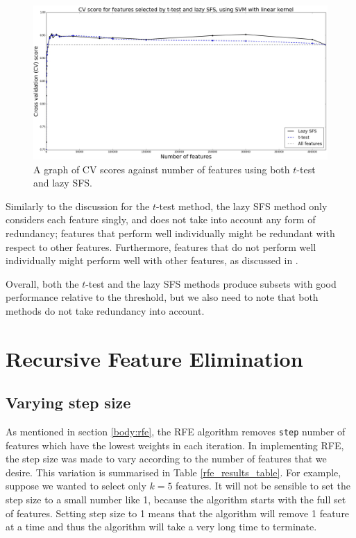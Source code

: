 \documentclass[12pt, twoside, a4paper]{report}
\begin{document}
\begin{figure}
\centering
\includegraphics[width=\textwidth]{images/t_test_and_lazy_sfs.jpeg}
\caption{A graph of CV scores against number of features using both $t$-test and lazy SFS.}
\label{body:t_test_and_lazy_sfs:graph}
\end{figure}

Similarly to the discussion for the $t$-test method, the lazy SFS method only considers each feature singly, and does not take into account any form of redundancy; features that perform well individually might be redundant with respect to other features. Furthermore, features that do not perform well individually might perform well with other features, as discussed in \cite{RefWorks:140}.


Overall, both the $t$-test and the lazy SFS methods produce subsets with good performance relative to the threshold, but we also need to note that both methods do not take redundancy into account.


\section{Recursive Feature Elimination} \label{eval:rfe}

\subsection{Varying step size}
As mentioned in section \ref{body:rfe}, the RFE algorithm removes \texttt{step} number of features which have the lowest weights in each iteration. In implementing RFE, the step size was made to vary according to the number of features that we desire. This variation is summarised in Table \ref{rfe_results_table}. For example, suppose we wanted to select only $k=5$ features. It will not be sensible to set the step size to a small number like 1, because the algorithm starts with the full set of features. Setting step size to 1 means that the algorithm will remove 1 feature at a time and thus the algorithm will take a very long time to terminate.
\end{document}

